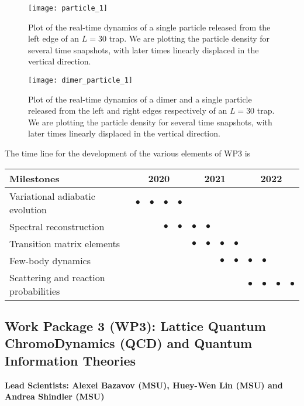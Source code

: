 \documentclass[10pt]{article}
\begin{document}
\begin{figure}
\centering
\texttt{[image: particle\_1]}
\caption{Plot of the real-time dynamics of a single particle released from the left edge of an $L=30$ trap.  We are plotting the particle density for several time snapshots, with later times linearly displaced in the vertical direction.}
\label{particle}
\end{figure}
 
\begin{figure}
\centering
\texttt{[image: dimer\_particle\_1]}
\caption{Plot of the real-time dynamics of a dimer and a single particle released from the left and right edges respectively of an $L=30$ trap.  We are plotting the particle density for
several time snapshots, with later times linearly displaced in the vertical
direction.}
\label{dimer_particle}
\end{figure}

 The time line for the development of the various elements of WP3 is
\begin{footnotesize}
\begin{center}
\begin{tabular}{|l|c|c|c|c|c|c|c|c|c|c|c|c|}
\hline
\multicolumn{1}{|l}{Milestones } & \multicolumn{4}{|c|}{ 2020 } & \multicolumn{4}{c|}{ 2021 } & \multicolumn{4}{c|}{ 2022 } \\
\hline
Variational adiabatic evolution &$\bullet$ &$\bullet$ &$\bullet$ &$\bullet$ & & & & & & & &  \\
\hline
Spectral reconstruction & & & $\bullet$ &$\bullet$ &$\bullet$ &$\bullet$ & & & & & &  \\
\hline
Transition matrix elements & & & & & $\bullet$ &$\bullet$ &$\bullet$ &$\bullet$ & & & &   \\
\hline
Few-body dynamics & & & & & & & $\bullet$ &$\bullet$ &$\bullet$ &$\bullet$ & &\\
\hline
Scattering and reaction probabilities & & & & & & & & & $\bullet$ &$\bullet$ &$\bullet$ &$\bullet$ \\
\hline

\end{tabular}
\end{center}
\end{footnotesize}

\subsection{Work Package 3 (WP3): Lattice Quantum ChromoDynamics (QCD) and Quantum Information Theories}
{\bf Lead Scientists: Alexei Bazavov (MSU), Huey-Wen Lin (MSU) and Andrea Shindler (MSU)}
\end{document}
